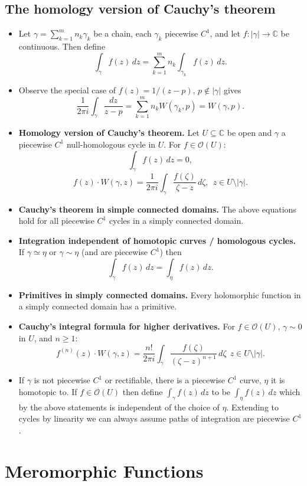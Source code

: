 \documentclass{article}
\newenvironment{topic}[1]{%
{\subsection{#1}}%
\begin{itemize}%
}{%
\end{itemize}%
}
\newcommand{\theorem}[1]{\item {\bf #1.}}
\newcommand{\corollary}[1]{\item {\bf #1.}}
\newcommand{\holo}[1]{\mathcal{O}(#1)}
\newcommand{\remark}{\item}
\begin{document}
\begin{topic}{The homology version of Cauchy's theorem}

\remark Let $\gamma = \sum_{k=1}^m n_k \gamma_k$ be a chain, each $\gamma_k$ piecewise $C^1$, and let $f : |\gamma| \to \mathbb{C}$ be continuous. Then define $$\int_\gamma f(z)\,dz = \sum_{k=1}^m n_k \int_{\gamma_k} f(z)\,dz.$$

\remark Observe the special case of $f(z) = 1/(z-p)$, $p \not\in |\gamma|$ gives $$\dfrac{1}{2 \pi i} \int_\gamma \dfrac{dz}{z - p} = \sum_{k=1}^m n_k W(\gamma_k, p) = W(\gamma, p).$$

\theorem{Homology version of Cauchy's theorem} Let $U \subseteq \mathbb{C}$ be open and $\gamma$ a piecewise $C^1$ null-homologous cycle in $U$. For $f \in \holo{U}$: $$\int_\gamma f(z)\,dz = 0,$$ $$f(z) \cdot W(\gamma, z) = \dfrac{1}{2 \pi i} \int_\gamma \dfrac{f(\zeta)}{\zeta - z}\,d\zeta,~~z \in U \setminus |\gamma|.$$

\corollary{Cauchy's theorem in simple connected domains} The above equations hold for all piecewise $C^1$ cycles in a simply connected domain.

\corollary{Integration independent of homotopic curves / homologous cycles} If $\gamma \simeq \eta$ or $\gamma \sim \eta$ (and are piecewise $C^1$) then $$\int_\gamma f(z)\,dz = \int_\eta f(z)\,dz.$$

\theorem{Primitives in simply connected domains} Every holomorphic function in a simply connected domain has a primitive.

\corollary{Cauchy's integral formula for higher derivatives} For $f \in \holo{U}$, $\gamma \sim 0$ in $U$, and $n \geq 1$: $$f^{(n)}(z) \cdot W(\gamma, z) = \dfrac{n!}{2 \pi i} \int_\gamma \dfrac{f(\zeta)}{(\zeta - z)^{n+1}}\,d\zeta~~z \in U \setminus |\gamma|.$$

\remark If $\gamma$ is not piecewise $C^1$ or rectifiable, there is a piecewise $C^1$ curve, $\eta$ it is homotopic to. If $f \in \holo{U}$ then define $\int_\gamma f(z)\,dz$ to be $\int_\eta f(z)\,dz$ which by the above statements is independent of the choice of $\eta$. Extending to cycles by linearity we can always assume paths of integration are piecewise $C^1$.

\end{topic}


\newpage
\section{Meromorphic Functions}
\end{document}
